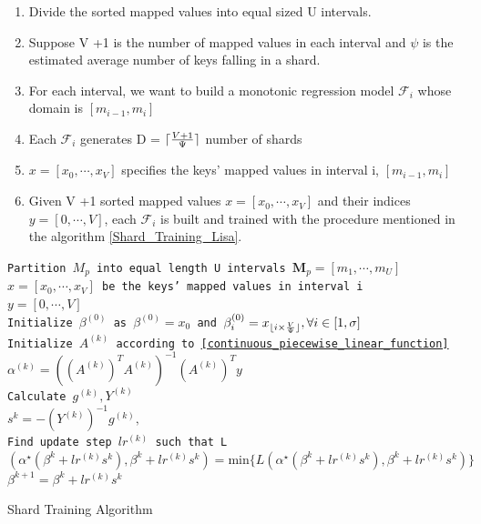 \begin{enumerate}
	\item Divide the sorted mapped values into equal sized U intervals.
	\item Suppose V +1 is the number of mapped values in each interval and $\psi$ is the estimated average number of keys falling in a shard.
	\item For each interval, we want to build a monotonic regression
    model $ \mathcal {F}_{i}$ whose domain is $[m_{i-1},m_{i}]$ 
 
 	\item Each $\mathcal{F}_{i}$ generates D = $\lceil\frac{V+1}{\Psi}\rceil$ number of shards 
    
    \item $x =[x_0,\cdots, x_V] $ specifies the keys' mapped values in interval i, $[m_{i-1},m_{i}]$ 
    
    \item Given V +1 sorted mapped values $x =[x_0,\cdots, x_V]$ and their indices $y =[0,\cdots, V]$, each $\mathcal{F}_{i}$ is built and trained with the procedure mentioned in the algorithm \ref{Shard_Training_Lisa}.
    

\end{enumerate}

\begin{algorithm}[H]
    \SetAlgoLined
    \texttt{Partition $M_{p}$ into equal length U intervals $\boldsymbol{M}_p=[m_1,\cdots, m_U]$ }
    {   
        \texttt{$x =[x_0,\cdots, x_V] $ be the keys' mapped values
        in interval i} \\
        \texttt{$y =[0,\cdots, V]$ } \\
        \texttt{Initialize $\beta^{(0)}$ as $\beta^{(0)}=x_0$ and $\beta_i^{(0)}=x_{\lfloor i\times \frac{V}{\Psi}\rfloor}, \forall i\in[1,\sigma]$} \\
        {
            \texttt{Initialize $A^{(k)}$ according to \eqref{continuous_piecewise_linear_function}} \\
            \texttt{$\alpha^{(k)}= ((A^{(k)})^T A^{(k)})^{-1}(A^{(k)})^Ty$} \\
            
            \texttt{Calculate $g^{(k)}, Y^{(k)}$ } \\
            \texttt{$s^{k} = -(Y^{(k)})^{-1} g^{(k)}, $ } \\
            
            \texttt{Find update step $lr^{(k)}$ such that    L$(\alpha^\star(\beta^{k}+ lr^{(k)}s^{k}), \beta^{k}+ lr^{(k)}s^{k}) =\text{min}\{L(\alpha^\star(\beta^{k}+ lr^{(k)}s^{k}), \beta^{k}+ lr^{(k)}s^{k})\} $} \\
            
            \texttt{$\beta^{k+1} = \beta^{k}+ lr^{(k)}s^{k}$ } \\
           
           
           
        }
    }
    
    \caption{Shard Training Algorithm}
    \label{Shard_Training_Lisa}
\end{algorithm}

